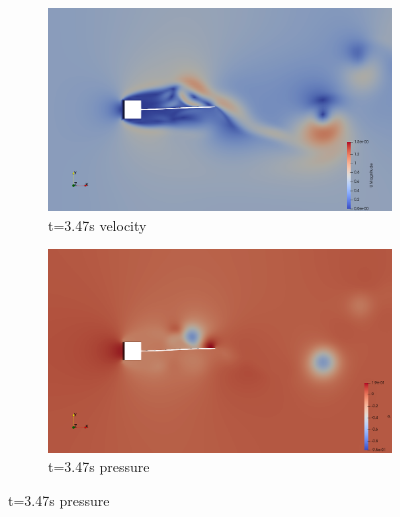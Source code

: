 \begin{figure}[htb]
\begin{subfigure}{0.5\textwidth}
  \includegraphics[width=\linewidth]{images/sq-cyl/sq_v2.png}
  \caption{t=3.47s velocity}
  \label{fig:sq_v2}
\end{subfigure}\hfil %
\begin{subfigure}{0.5\textwidth}
  \includegraphics[width=\linewidth]{images/sq-cyl/sq_p2.png}
  \caption{t=3.47s pressure}
  \label{fig:sq_p2}
\end{subfigure}\hfil %

\medskip


\end{figure}
